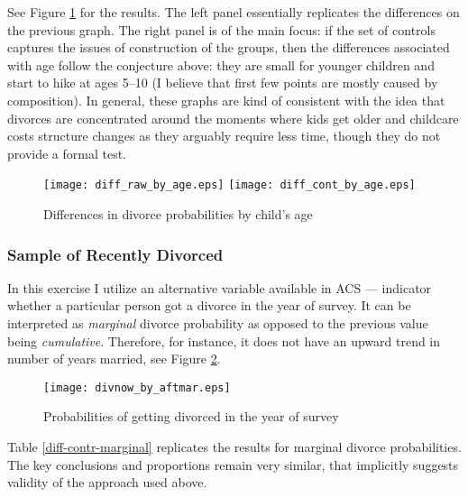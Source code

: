 \documentclass[12pt,letter]{article}
\begin{document}
See Figure \ref{pics-diff} for the results. The left panel essentially replicates the differences on the previous graph. The right panel is of the main focus: if the set of controls captures the issues of construction of the groups, then the differences associated with age follow the conjecture above: they are small for younger children and start to hike at ages 5--10 (I believe that first few points are mostly caused by composition). In general, these graphs are kind of consistent with the idea that divorces are concentrated around the moments where kids get older and childcare costs structure changes as they arguably require less time, though they do not provide a formal test.
\begin{figure}[h!]
\texttt{[image: diff\_raw\_by\_age.eps]}
\texttt{[image: diff\_cont\_by\_age.eps]}
\caption{Differences in divorce probabilities by child's age\label{pics-diff}}
\end{figure}

\subsubsection{Sample of Recently Divorced}
In this exercise I utilize an alternative variable available in ACS --- indicator whether a particular person got a divorce in the year of survey. It can be interpreted as \textit{marginal} divorce probability as opposed to the previous value being \emph{cumulative}. Therefore, for instance, it does not have an upward trend in number of years married, see Figure \ref{pic-now-aftmar}. 
\begin{figure}[h]
\centering
\texttt{[image: divnow\_by\_aftmar.eps]}
\caption{Probabilities of getting divorced in the year of survey\label{pic-now-aftmar}}
\end{figure}

Table \ref{diff-contr-marginal} replicates the results for marginal divorce probabilities. The key conclusions and proportions remain very similar, that implicitly suggests validity of the approach used above.
\end{document}

